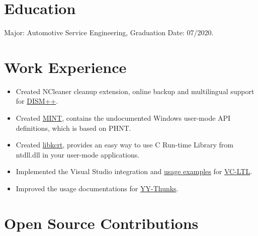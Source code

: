 \documentclass{resume}
\begin{document}
\renewcommand\headrulewidth{0pt}



\section{Education}

  Major: Automotive Service Engineering, Graduation Date: 07/2020.

\section{Work Experience}


\begin{itemize}
  \item Created NCleaner cleanup extension, online backup and multilingual support for \href{http://www.chuyu.me/zh-Hans/index.html}{DISM++}.
  \item Created \href{https://github.com/Chuyu-Team/MINT}{MINT}, contains the undocumented Windows user-mode API definitions, which is based on PHNT.
  \item Created \href{https://github.com/Chuyu-Team/libkcrt}{libkcrt}, provides an easy way to use C Run-time Library from ntdll.dll in your user-mode applications.
  \item Implemented the Visual Studio integration and \href{https://github.com/Chuyu-Team/vc-ltl-samples}{usage examples} for \href{https://github.com/Chuyu-Team/VC-LTL}{VC-LTL}.
  \item Improved the usage documentations for \href{https://github.com/Chuyu-Team/YY-Thunks}{YY-Thunks}.
\end{itemize}

\section{Open Source Contributions}
\end{document}
